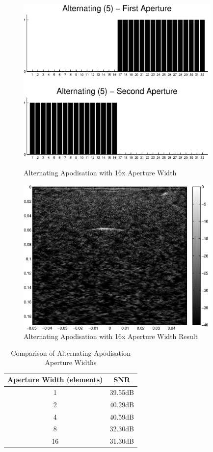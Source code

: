 \begin{figure}[htbp]
\centering
		\includegraphics[width=100mm]{Alternating5.eps}
		\caption{Alternating Apodisation with 16x Aperture Width}
		\label{fig:apod16}


		\includegraphics[width=100mm]{16_SAC.eps}
		\caption{Alternating Apodisation with 16x Aperture Width Result}
		\label{fig:apod16_result}
\end{figure}

\begin{table}[h!]
\begin{center}
	\begin{tabular}{| c | c |}
 	\hline 
	\textbf{Aperture Width (elements)} & \textbf{SNR} \\ \hline \hline 
	1	& 39.55dB \\ \hline
	2 & 40.29dB \\ \hline
	4 & 40.59dB \\ \hline
	8 & 32.30dB \\ \hline
	16 & 31.30dB \\ \hline
	\end{tabular}
	\caption{Comparison of Alternating Apodisation Aperture Widths}
	\label{table:alter_methods}
	\end{center}
	\end{table}
\clearpage
